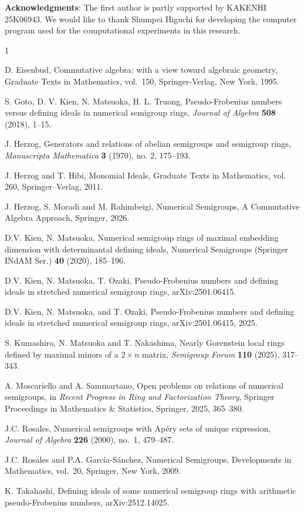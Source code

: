 \documentclass[12pt]{amsart}
\numberwithin{equation}{section}
\theoremstyle{definition}
\begin{document}
\noindent
\textbf{Acknowledgments}:
The first author is partly supported by KAKENHI 25K06943.
We would like to thank Shumpei Higuchi for developing the computer program used for the computational experiments in this research.


\begin{thebibliography}{1}


D. Eisenbud,
Commutative algebra: with a view toward algebraic geometry, Graduate Texts in Mathematics, vol.\ 150, Springer-Verlag, New York, 1995.


S. Goto, D. V. Kien, N. Matsuoka, H. L. Truong,
Pseudo-Frobenius numbers versus defining ideals in numerical semigroup rings, \textit{Journal of Algebra} \textbf{508} (2018), 1--15.

J. Herzog,
Generators and relations of abelian semigroups and semigroup rings,
\textit{Manuscripta Mathematica} {\bf 3} (1970), no. 2, 175--193.


J. Herzog and T. Hibi,
Monomial Ideals, Graduate Texts in Mathematics, vol. 260, Springer--Verlag, 2011.

J. Herzog, S. Moradi and M. Rahimbeigi,
Numerical Semigroups, A Commutative Algebra Approach,
Springer, 2026.


D.V. Kien, N. Matsuoka,
Numerical semigroup rings of maximal embedding dimension with determinantal defining ideals, Numerical Semigroups (Springer INdAM Ser.) \textbf{40} (2020), 185--196.

D.V. Kien, N. Matsuoka, T. Ozaki,
Pseudo-Frobenius numbers and defining ideals in stretched numerical semigroup rings, arXiv:2501.06415.

D.V. Kien, N. Matsuoka, and T. Ozaki,
Pseudo-Frobenius numbers and defining ideals in stretched numerical semigroup rings,
arXiv:2501.06415, 2025.


S. Kumashiro, N. Matsuoka and T. Nakashima,
Nearly Gorenstein local rings defined by maximal minors of a $2 \times n$ matrix,
\textit{Semigroup Forum} \textbf{110} (2025), 317--343.

A. Moscariello and A. Sammartano,
Open problems on relations of numerical semigroups,
in \textit{Recent Progress in Ring and Factorization Theory},
Springer Proceedings in Mathematics \& Statistics,
Springer, 2025, 365--380.


J.C. Rosales,
Numerical semigroups with Ap\'ery sets of unique expression,
\textit{Journal of Algebra} \textbf{226} (2000), no.\ 1, 479--487.

J.C. Rosales and P.A. Garc\'ia-S\'anchez,
Numerical Semigroups,
Developments in Mathematics, vol.\ 20,
Springer, New York, 2009.


K. Takahashi,
Defining ideals of some numerical semigroup rings with arithmetic pseudo-Frobenius numbers,
arXiv:2512.14025.



\end{thebibliography}
\end{document}
